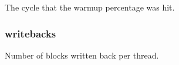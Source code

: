 \label{group__CacheStatistics_ga2607cf0f839148422c1a78a9e21e2c29}
The cycle that the warmup percentage was hit. \hypertarget{group__CacheStatistics_gace2b37e760e47862f243e4b03c05ef5e}{
\subsubsection[{writebacks}]{ writebacks}}
\label{group__CacheStatistics_gace2b37e760e47862f243e4b03c05ef5e}
Number of blocks written back per thread. 